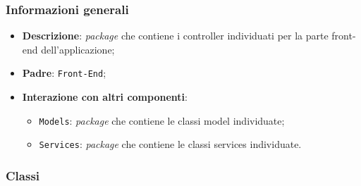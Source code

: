 \subsubsection{Informazioni generali}
\begin{itemize}
	\item \textbf{Descrizione}: \textit{package} che contiene i controller individuati per la parte front-end dell'applicazione;
	\item \textbf{Padre}: \texttt{Front-End};
	\item \textbf{Interazione con altri componenti}:
	\begin{itemize}
		\item \texttt{Models}: \textit{package} che contiene le classi model individuate;
		\item \texttt{Services}: \textit{package} che contiene le classi services individuate.
	\end{itemize} 
\end{itemize}
\subsubsection{Classi}

